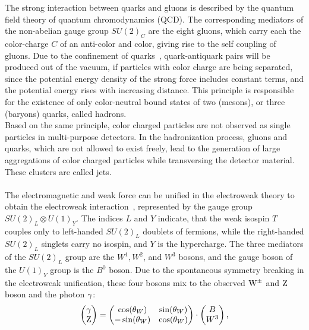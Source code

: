 The strong interaction between quarks and gluons is described by the quantum field theory of quantum chromodynamics (QCD). The corresponding mediators of the non-abelian gauge group $SU(2)_C$ are the eight gluons, which carry each the color-charge $C$ of an anti-color and color, giving rise to the self coupling of gluons. Due to the confinement of quarks~\cite{Confinement}, quark-antiquark pairs will be produced out of the vacuum, if particles with color charge are being separated, since the potential energy density of the strong force includes constant terms, and the potential energy rises with increasing distance. This principle is responsible for the existence of only color-neutral bound states of two (mesons), or three (baryons) quarks, called hadrons.\\
Based on the same principle, color charged particles are not observed as single particles in multi-purpose detectors. In the hadronization process, gluons and quarks, which are not allowed to exist freely, lead to the generation of large aggregations of color charged particles while transversing the detector material. These clusters are called jets.
\\\\
The electromagnetic and weak force can be unified in the electroweak theory to obtain the electroweak interaction~\cite{Weinberg,Weinberg2,Salam,Glashow}, represented by the gauge group $ SU(2)_L\otimes U(1)_Y$. The indices $L$ and $Y$ indicate, that the weak isospin $T$ couples only to left-handed $SU(2)_L$ doublets of fermions, while the right-handed $SU(2)_L$ singlets carry no isospin, and $Y$ is the hypercharge. The three mediators of the $SU(2)_L$ group are the $W^1,W^2$, and $W^3$ bosons, and the gauge boson of the $U(1)_Y$ group is the $B^0$ boson.
Due to the spontaneous symmetry breaking in the electroweak unification, these four bosons mix to the observed $\mathrm{W}^\pm$ and $\mathrm{Z}$ boson and the photon $\gamma$:
\begin{equation}
 \left(
 \begin{matrix}
  \gamma \\
  \mathrm{Z}
 \end{matrix}
 \right)
 =
 \left(\begin{matrix}
  \cos(\theta_W)  & \sin(\theta_W) \\
  -\sin(\theta_W) & \cos(\theta_W) 
 \end{matrix}\right)
 \cdot
 \left(
 \begin{matrix}
  B \\
  W^3
 \end{matrix}
 \right),
\end{equation}

